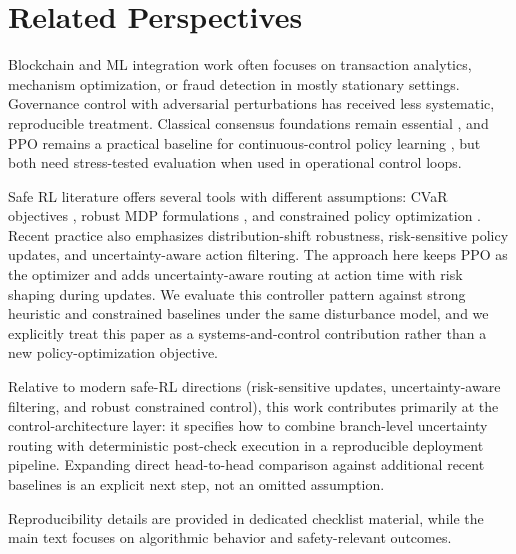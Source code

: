\section{Related Perspectives}

Blockchain and ML integration work often focuses on transaction analytics, mechanism optimization, or fraud detection in mostly stationary settings. Governance control with adversarial perturbations has received less systematic, reproducible treatment. Classical consensus foundations remain essential \citep{nakamoto2008bitcoin}, and PPO remains a practical baseline for continuous-control policy learning \citep{schulman2017ppo}, but both need stress-tested evaluation when used in operational control loops.

Safe RL literature offers several tools with different assumptions: CVaR objectives \citep{chow2015cvar}, robust MDP formulations \citep{iyengar2005robust}, and constrained policy optimization \citep{achiam2017cpo}. Recent practice also emphasizes distribution-shift robustness, risk-sensitive policy updates, and uncertainty-aware action filtering. The approach here keeps PPO as the optimizer and adds uncertainty-aware routing at action time with risk shaping during updates. We evaluate this controller pattern against strong heuristic and constrained baselines under the same disturbance model, and we explicitly treat this paper as a systems-and-control contribution rather than a new policy-optimization objective.

Relative to modern safe-RL directions (risk-sensitive updates, uncertainty-aware filtering, and robust constrained control), this work contributes primarily at the control-architecture layer: it specifies how to combine branch-level uncertainty routing with deterministic post-check execution in a reproducible deployment pipeline. Expanding direct head-to-head comparison against additional recent baselines is an explicit next step, not an omitted assumption.

Reproducibility details are provided in dedicated checklist material, while the main text focuses on algorithmic behavior and safety-relevant outcomes.
